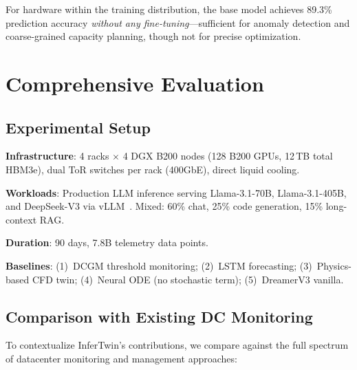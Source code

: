 \documentclass[conference,10pt]{IEEEtran}
\begin{document}
For hardware within the training distribution, the base model achieves 89.3\% prediction accuracy \emph{without any fine-tuning}---sufficient for anomaly detection and coarse-grained capacity planning, though not for precise optimization.

\section{Comprehensive Evaluation}
\label{sec:eval}

\subsection{Experimental Setup}

\textbf{Infrastructure}: 4 racks $\times$ 4 DGX B200 nodes (128 B200 GPUs, 12\,TB total HBM3e), dual ToR switches per rack (400GbE), direct liquid cooling.

\textbf{Workloads}: Production LLM inference serving Llama-3.1-70B, Llama-3.1-405B, and DeepSeek-V3 via vLLM~\cite{kwon2023vllm}. Mixed: 60\% chat, 25\% code generation, 15\% long-context RAG.

\textbf{Duration}: 90 days, 7.8B telemetry data points.

\textbf{Baselines}: (1)~DCGM threshold monitoring; (2)~LSTM forecasting; (3)~Physics-based CFD twin; (4)~Neural ODE (no stochastic term); (5)~DreamerV3 vanilla.


\subsection{Comparison with Existing DC Monitoring}

To contextualize InferTwin's contributions, we compare against the full spectrum of datacenter monitoring and management approaches:

\begin{table}[!htbp]
\caption{InferTwin vs.\ Existing DC Management Approaches}
\label{tab:compare}
\centering\scriptsize
{}
\end{table}
\end{document}

